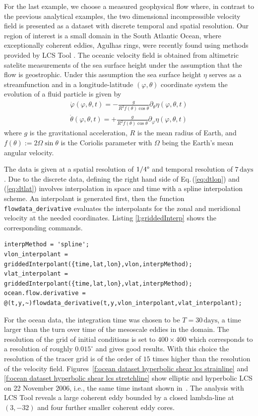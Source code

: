 \documentclass{article}
\begin{document}
For the last example, we choose a measured geophysical flow where, in contrast to the previous analytical examples, the two dimensional incompressible velocity field is presented as a dataset with discrete temporal and spatial resolution. Our region of interest is a small domain in the South Atlantic Ocean, where exceptionally coherent eddies, Agulhas rings, were recently found using methods provided by LCS Tool \parencite{haller13:_coher_lagran}. The oceanic velocity field is obtained from altimetric satelite measurements of the sea surface height under the assumption that the flow is geostrophic. Under this assumption the sea surface height $\eta$ serves as a streamfunction and in a longitude-latitude $(\varphi,\theta)$ coordinate system the evolution of a fluid particle is given by
\begin{eqnarray}
\dot{\varphi}(\varphi,\theta,t) = -\frac{g}{R^2 f(\theta) \cos\theta}\partial_{\theta}\eta(\varphi,\theta,t)\label{eq:dtlon}\\
\dot{\theta}(\varphi,\theta,t) = +\frac{g}{R^2 f(\theta) \cos\theta}\partial_{\varphi}\eta(\varphi,\theta,t)
\label{eq:dtlat}
\end{eqnarray}
where $g$ is the gravitational acceleration, $R$ is the mean radius of Earth, and $f(\theta):=2\Omega\sin\theta$ is the Coriolis parameter with $\Omega$ being the Earth's mean angular velocity. 

The data is given at a spatial resolution of $1/4\degree$ and temporal resolution of $7\,\mathrm{days}$. Due to the discrete data, defining the right hand side of Eq.\,(\ref{eq:dtlon}) and (\ref{eq:dtlat}) involves interpolation in space and time with a spline interpolation scheme. An interpolant is generated first, then the function \lstinline!flowdata_derivative! evaluates the interpolants for the zonal and meridional velocity at the needed coordinates. Listing \ref{l:griddedInterp} shows the corresponding commands.
\begin{lstlisting}[caption={Generate interpolant of ocean velocity data set.},label=l:griddedInterp]
% Define right hand side of ODE, ocean.flow.derivative
interpMethod = 'spline';
vlon_interpolant = griddedInterpolant({time,lat,lon},vlon,interpMethod);
vlat_interpolant = griddedInterpolant({time,lat,lon},vlat,interpMethod);
ocean.flow.derivative = @(t,y,~)flowdata_derivative(t,y,vlon_interpolant,vlat_interpolant);
\end{lstlisting}
For the ocean data, the integration time was chosen to be $T=30\,\mathrm{days}$, 
a time larger than the turn over time of the mesoscale eddies in the domain. The resolution of the grid of initial conditions is set to $400\times400$ which corresponds to a resolution of roughly $0.015^\circ$ and gives good results. With this choice the resolution of the tracer grid is of the order of $15$ times higher than the resolution of the velocity field.
Figures~\ref{f:ocean dataset hyperbolic shear lcs strainline} and \ref{f:ocean dataset hyperbolic shear lcs stretchline} show elliptic and hyperbolic LCS on 22 November 2006, i.e., the same time instant shown in~\textcite{haller13:_coher_lagran,beron-vera13:_objec_agulh}. The analysis with LCS Tool reveals a large coherent eddy bounded by a closed lambda-line at $(3,-32)$ and four further smaller coherent eddy cores.
\end{document}
